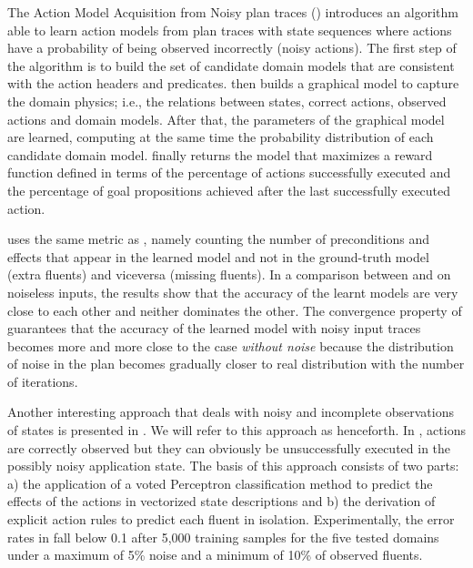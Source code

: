 The Action Model Acquisition from Noisy plan traces (\textbf{\AMAN}) \cite{zhuo2013action} introduces an algorithm able to learn action models from plan traces with \NO state sequences where actions have a probability of being observed incorrectly (noisy actions). The first step of the \AMAN algorithm is to build the set of candidate domain models that are consistent with the action headers and predicates. \AMAN then builds a graphical model to capture the domain physics; i.e., the relations between states, correct actions, observed actions and domain models. After that, the parameters of the graphical model are learned, computing at the same time the probability distribution of each candidate domain model. \AMAN finally returns the model that maximizes a reward function defined in terms of the percentage of actions successfully executed and the percentage of goal propositions achieved after the last successfully executed action.

\AMAN uses the same metric as \LAMP, namely counting the number of preconditions and effects that appear in the learned model and not in the ground-truth model (extra fluents) and viceversa (missing fluents). In a comparison between \AMAN and \ARMS on noiseless inputs, the results show that the accuracy of the learnt models are very close to each other and neither dominates the other. The convergence property of \AMAN guarantees that the accuracy of the learned model with noisy input traces becomes more and more close to the case  \emph{without noise} because the distribution of noise in the plan becomes gradually closer to real distribution with the number of iterations.


Another interesting approach that deals with noisy and incomplete observations of states is presented in \cite{MouraoZPS12}. We will refer to this approach as \textbf{\NOISTA} henceforth. In \NOISTA, actions are correctly observed but they can obviously be unsuccessfully executed in the possibly noisy application state. The basis of this approach consists of two parts: a) the application of a voted Perceptron classification method to predict the effects of the actions in vectorized state descriptions and b) the derivation of explicit \strips \texttt{} action rules to predict each fluent in isolation. Experimentally, the error rates in \NOISTA fall below 0.1 after 5,000 training samples for the five tested domains under a maximum of 5\% noise and a minimum of 10\% of observed fluents.


